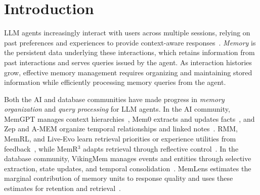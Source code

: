 \section{Introduction}
\label{sec:intro}




LLM agents increasingly interact with users across multiple sessions, relying on past preferences and experiences to provide context-aware responses~\cite{memgpt,locomo,longmemeval}.
\emph{Memory} is the persistent data underlying these interactions, which retains information from past interactions and serves queries issued by the agent.
As interaction histories grow, effective memory management requires organizing and maintaining stored information while efficiently processing memory queries from the agent.


Both the AI and database communities have made progress in \emph{memory organization} and \emph{query processing} for LLM agents.
In the AI community, MemGPT manages context hierarchies~\cite{memgpt}, Mem0 extracts and updates facts~\cite{mem0}, and Zep and A-MEM organize temporal relationships and linked notes~\cite{zep,agenticmem}. RMM, MemRL, and Live-Evo learn retrieval priorities or experience utilities from feedback~\cite{rmm,memrl,liveevo}, while MemR$^3$ adapts retrieval through reflective control~\cite{memr3}.
In the database community, VikingMem manages events and entities through selective extraction, state updates, and temporal consolidation~\cite{vikingmem}. MemLens estimates the marginal contribution of memory units to response quality and uses these estimates for retention and retrieval~\cite{memlens}.

